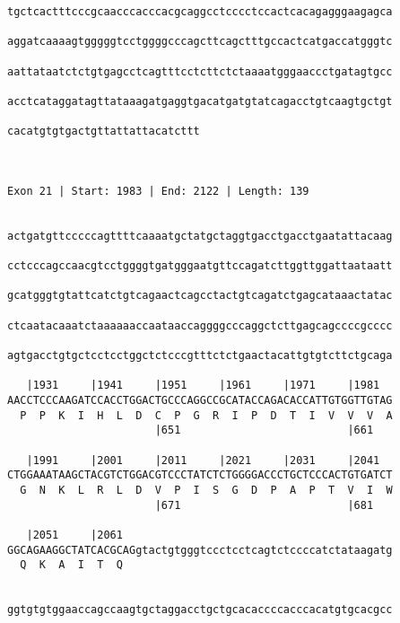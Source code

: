 \documentclass{article}
\begin{document}
\begin{Verbatim}
tgctcactttcccgcaacccacccacgcaggcctcccctccactcacagagggaagagca
                                                            
aggatcaaaagtgggggtcctggggcccagcttcagctttgccactcatgaccatgggtc
                                                            
aattataatctctgtgagcctcagtttcctcttctctaaaatgggaaccctgatagtgcc
                                                            
acctcataggatagttataaagatgaggtgacatgatgtatcagacctgtcaagtgctgt
                                                            
cacatgtgtgactgttattattacatcttt
                              
                              
 
Exon 21 | Start: 1983 | End: 2122 | Length: 139


actgatgttcccccagttttcaaaatgctatgctaggtgacctgacctgaatattacaag
                                                            
cctcccagccaacgtcctggggtgatgggaatgttccagatcttggttggattaataatt
                                                            
gcatgggtgtattcatctgtcagaactcagcctactgtcagatctgagcataaactatac
                                                            
ctcaatacaaatctaaaaaaccaataaccaggggcccaggctcttgagcagccccgcccc
                                                            
agtgacctgtgctcctcctggctctcccgtttctctgaactacattgtgtcttctgcaga
                                                            
   |1931     |1941     |1951     |1961     |1971     |1981  
AACCTCCCAAGATCCACCTGGACTGCCCAGGCCGCATACCAGACACCATTGTGGTTGTAG
  P  P  K  I  H  L  D  C  P  G  R  I  P  D  T  I  V  V  V  A
                       |651                          |661   
  
   |1991     |2001     |2011     |2021     |2031     |2041  
CTGGAAATAAGCTACGTCTGGACGTCCCTATCTCTGGGGACCCTGCTCCCACTGTGATCT
  G  N  K  L  R  L  D  V  P  I  S  G  D  P  A  P  T  V  I  W
                       |671                          |681   
  
   |2051     |2061                                          
GGCAGAAGGCTATCACGCAGgtactgtgggtccctcctcagtctccccatctataagatg
  Q  K  A  I  T  Q                                          
                                                            
  
ggtgtgtggaaccagccaagtgctaggacctgctgcacaccccacccacatgtgcacgcc
                                                            

\end{Verbatim}
\end{document}
